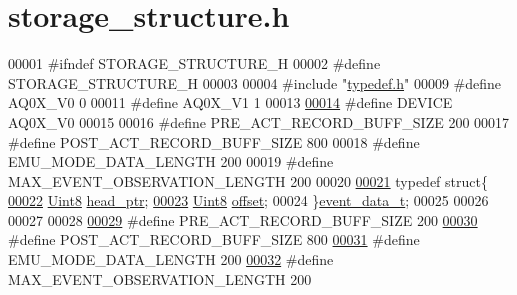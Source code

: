 \hypertarget{a00006_source}{\section{storage\+\_\+structure.\+h}
\label{a00006_source}
}

\begin{DoxyCode}
00001 \textcolor{preprocessor}{#ifndef STORAGE\_STRUCTURE\_H}
00002 \textcolor{preprocessor}{#define STORAGE\_STRUCTURE\_H}
00003 
00004 \textcolor{preprocessor}{#include "\hyperlink{a00004}{typedef.h}"}
00009 \textcolor{preprocessor}{#define  AQ0X\_V0      0}
00011 \textcolor{preprocessor}{#define  AQ0X\_V1      1}
00013 
\hypertarget{a00006_source_l00014}{}\hyperlink{a00006_a775d096fbc3988fb7ed858b79ef44e22}{00014} \textcolor{preprocessor}{#define  DEVICE      AQ0X\_V0}
00015 
00016 \textcolor{preprocessor}{#define PRE\_ACT\_RECORD\_BUFF\_SIZE                                200}
00017 \textcolor{preprocessor}{#define POST\_ACT\_RECORD\_BUFF\_SIZE                               800}
00018 \textcolor{preprocessor}{#define EMU\_MODE\_DATA\_LENGTH                                    200}
00019 \textcolor{preprocessor}{#define MAX\_EVENT\_OBSERVATION\_LENGTH                            200}
00020 
\hypertarget{a00006_source_l00021}{}\hyperlink{a00006}{00021} \textcolor{keyword}{typedef} \textcolor{keyword}{struct}\{
\hypertarget{a00006_source_l00022}{}\hyperlink{a00006_abcdcf9a1889bf0892658828ceac54668}{00022}         \hyperlink{a00004_a979e3e23b9a449e69ab6a8a83b6042f8}{Uint8}                     \hyperlink{a00006_abcdcf9a1889bf0892658828ceac54668}{head\_ptr};
\hypertarget{a00006_source_l00023}{}\hyperlink{a00006_a90588fed720ad404c18bcbb8fa84878e}{00023}         \hyperlink{a00004_a979e3e23b9a449e69ab6a8a83b6042f8}{Uint8}                     \hyperlink{a00006_a90588fed720ad404c18bcbb8fa84878e}{offset};
00024 \}\hyperlink{a00006_d6/d7d/a00161}{event\_data\_t};
00025 
00026 
00027 
00028 
\hypertarget{a00006_source_l00029}{}\hyperlink{a00006_a18dcecc16ded13fa622e0913e73442e6}{00029} \textcolor{preprocessor}{#define PRE\_ACT\_RECORD\_BUFF\_SIZE                                200}
\hypertarget{a00006_source_l00030}{}\hyperlink{a00006_ab1ad440de86fff80e517ad748de2ee39}{00030} \textcolor{preprocessor}{#define POST\_ACT\_RECORD\_BUFF\_SIZE                               800}
\hypertarget{a00006_source_l00031}{}\hyperlink{a00006_af4c3a8ad94feb4d7bda7f107f34baf41}{00031} \textcolor{preprocessor}{#define EMU\_MODE\_DATA\_LENGTH                                    200}
\hypertarget{a00006_source_l00032}{}\hyperlink{a00006_aa060aeb1ecb530b3c6f6d91060999b70}{00032} \textcolor{preprocessor}{#define MAX\_EVENT\_OBSERVATION\_LENGTH                            200}

\end{DoxyCode}
